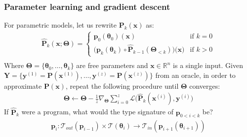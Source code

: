 \documentclass{beamer}
\begin{document}
    \begin{frame}
        \frametitle{Parameter learning and gradient descent}
        For parametric models, let us rewrite $\mathbf{P}_k(\mathbf{x})$ as:
        \begin{align*}
            \mathbf{\hat P}_k(\mathbf{x}; \mathbf{\boldsymbol\Theta}) = \begin{cases} \mathbf{p}_0(\boldsymbol\theta_0)(\mathbf{x}) &\text{if } k=0\\ \big(\mathbf{p}_k(\boldsymbol\theta_k)\circ \mathbf{\hat P}_{k-1}(\boldsymbol\Theta_{<k})\big)\big(\mathbf{x}\big)&\text{if } k > 0 \end{cases} \\
        \end{align*}
        Where $\boldsymbol\Theta = \{\boldsymbol\theta_0, \dots, \boldsymbol\theta_k\}$ are free parameters and $\mathbf{x} \in \mathbb{R}^n$ is a single input. Given $\mathbf{Y} = \{\mathbf{y}^{(1)} = \mathbf{P}(\mathbf{x}^{(1)}), \dots, \mathbf{y}^{(z)} = \mathbf{P}(\mathbf{x}^{(z)})\}$ from an oracle, in order to approximate $\mathbf{P}(\mathbf x)$, repeat the following procedure until $\boldsymbol\Theta$ converges:
        \begin{align*}
            \boldsymbol\Theta \leftarrow \boldsymbol\Theta - \frac{1}{z}\nabla_{\boldsymbol\Theta} \sum_{i=0}^z\mathcal{L}\big(\mathbf{\hat P}_k(\mathbf{x}^{(i)}), \mathbf{y}^{(i)}\big)
        \end{align*}
        If $\mathbf{\hat P}_{k}$ were a program, what would the type signature of $\mathbf{p}_{0<i<k}$ be?
        \begin{align*}
            \mathbf{p}_i: \mathcal{T}_{out}(\mathbf{p}_{i-1}) \times \mathcal{T}(\boldsymbol\theta_{i}) \rightarrow \mathcal{T}_{in}(\mathbf{p}_{i+1}(\boldsymbol\theta_{i+1}))
        \end{align*}
    \end{frame}

\end{document}
